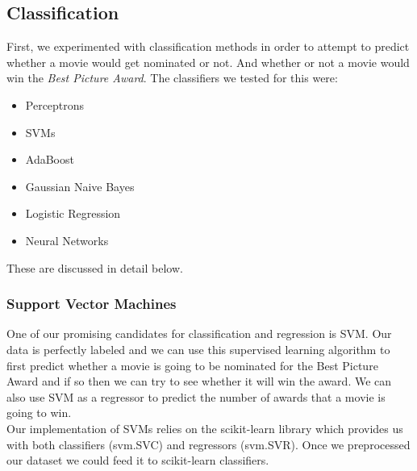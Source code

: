\documentclass[journal,transmag]{IEEEtran}
\begin{document}
		\subsection{Classification}
			First, we experimented with classification methods in order to attempt to predict whether a movie would get nominated or not. And whether or not a movie would win the \emph{Best Picture Award}. The classifiers we tested for this were:
			\begin{itemize}
				\item Perceptrons
				\item SVMs
				\item AdaBoost
				\item Gaussian Naive Bayes
				\item Logistic Regression
				\item Neural Networks
			\end{itemize}
			These are discussed in detail below.
		
			\subsubsection{Support Vector Machines}
			
			One of our promising candidates for classification and regression is SVM. Our data is perfectly labeled and we can use this supervised learning algorithm to first predict whether a movie is going to be nominated for the Best Picture Award and if so then we can try to see whether it will win the award. We can also use SVM as a regressor to predict the number of awards that a movie is going to win.\\ 
Our implementation of SVMs relies on the scikit-learn library which provides us with both classifiers (svm.SVC) and regressors (svm.SVR). Once we preprocessed our dataset we could feed it to scikit-learn classifiers.
\end{document}
